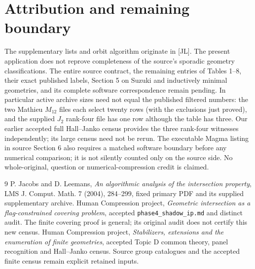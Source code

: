 \documentclass[11pt]{article}
\begin{document}
\section{Attribution and remaining boundary}
The supplementary lists and orbit algorithm originate in [JL]. The
present application does not reprove completeness of the source's
sporadic geometry classifications. The entire source contract, the remaining entries of Tables
1--8, their exact published labels, Section 5 on Suzuki and inductively
minimal geometries, and its complete software correspondence remain
pending. In particular active archive sizes need not equal the published
filtered numbers: the two Mathieu $M_{12}$ files each select twenty rows (with the exclusions just proved),
and the supplied $J_2$ rank-four file has one row although the table has
three. Our earlier accepted full Hall--Janko census provides the three
rank-four witnesses independently; its large census need not be rerun.
The executable Magma listing in source Section 6 also requires a matched
software boundary before any numerical comparison; it is not silently
counted only on the source side. No whole-original, question or
numerical-compression credit is claimed.

\begin{thebibliography}{9}
 P. Jacobs and D. Leemans, \emph{An algorithmic analysis
of the intersection property}, LMS J. Comput. Math. 7 (2004), 284--299,
fixed primary PDF and its supplied supplementary archive.
 Human Compression project, \emph{Geometric
intersection as a flag-constrained covering problem}, accepted
\texttt{phase4\_shadow\_ip.md} and distinct audit. The finite covering
proof is general; its original audit does not certify this new census.
 Human Compression project, \emph{Stabilizers, extensions and the enumeration of finite geometries}, accepted Topic D common theory, panel
recognition and Hall--Janko census. Source group catalogues and the
accepted finite census remain explicit retained inputs.
\end{thebibliography}
\end{document}
